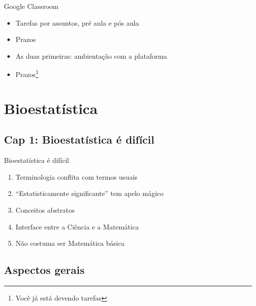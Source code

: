 \documentclass{beamer}
\begin{document}
\begin{frame}{\scriptsize Google Classroom}
  \begin{itemize}
  \item Tarefas por assuntos, pré aula e pós aula
  \item Prazos
  \item As duas primeiras: ambientação com a plataforma
  \item Prazos\footnote{Você já está devendo tarefas}
  \end{itemize}
\end{frame}

\section{Bioestatística}

\subsection{Cap 1: Bioestatística é difícil}

\begin{frame}{\scriptsize Bioestatística é difícil}
  \begin{enumerate}
  \item Terminologia conflita com termos usuais
  \item ``Estatisticamente significante'' tem apelo mágico
  \item Conceitos abstratos
  \item Interface entre a Ciência e a Matemática
  \item Não costuma ser Matemática básica
  \end{enumerate}
\end{frame}

\subsection{Aspectos gerais}
\end{document}
